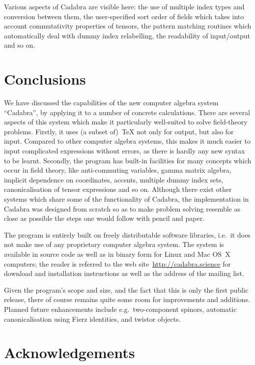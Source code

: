 \documentclass[11pt]{article}
\newcommand{\Cdb}{{Cadabra}\xspace}
\begin{document}
Various aspects of \Cdb are visible here: the use of multiple
index types and conversion between them, the user-specified sort order
of fields which takes into account commutativity properties of
tensors, the pattern matching routines which automatically deal with dummy
index relabelling, the readability of input/output and so on. 


\section{Conclusions}

We have discussed the capabilities of the new computer algebra system
``\Cdb'', by applying it to a number of concrete calculations. There are
several aspects of this system which make it particularly well-suited
to solve field-theory problems. Firstly, it uses (a subset of)~\TeX{}
not only for output, but also for input. Compared to other computer
algebra systems, this makes it much easier to input complicated
expressions without errors, as there is hardly any new syntax to be
learnt. Secondly, the program has built-in facilities for many
concepts which occur in field theory, like anti-commuting variables,
gamma matrix algebra, implicit dependence on coordinates, accents,
multiple dummy index sets, canonicalisation of tensor expressions and
so on. Although there exist other systems which share some of the
functionality of \Cdb, the implementation in \Cdb was designed from
scratch so as to make problem solving resemble as close as possible
the steps one would follow with pencil and paper.

The program is entirely built on freely distributable software
libraries, i.e.~it does not make use of any proprietary computer
algebra system.  The system is available in source code as well as in
binary form for Linux and Mac OS~X computers; the reader is referred
to the web site~\url{http://cadabra.science} for download and
installation instructions as well as the address of the mailing list.

Given the program's scope and size, and the fact that this is only the
first public release, there of course remains quite some room for
improvements and additions. Planned future enhancements include
e.g.~two-component spinors, automatic canonicalisation using
Fierz identities, and twistor objects. 

\vfill\eject

\section*{Acknowledgements}
\end{document}
